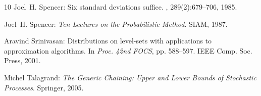 \documentclass[11pt]{article}
\numberwithin{equation}{section}
\theoremstyle{definition}
\theoremstyle{plain}
\begin{document}
\begin{thebibliography}{10}
{\sc Joel~H. Spencer}: Six standard deviations suffice.
, 289(2):679--706, 1985.
\newblock [\epfmtdoi{10.1090/S0002-9947-1985-0784009-0}]

{\sc Joel~H. Spencer}: {\em Ten Lectures on the Probabilistic Method}.
\newblock SIAM, 1987.
\newblock [\epfmtdoi{10.1137/1.9781611970074}]

{\sc Aravind Srinivasan}: Distributions on level-sets with applications to
  approximation algorithms.
\newblock In {\em Proc. 42nd FOCS}, pp. 588--597. IEEE Comp. Soc. Press, 2001.

{\sc Michel Talagrand}: {\em The Generic Chaining: Upper and Lower Bounds of
  Stochastic Processes}.
\newblock Springer, 2005.
\newblock [\epfmtdoi{10.1007/3-540-27499-5}]

\end{thebibliography}
\end{document}
